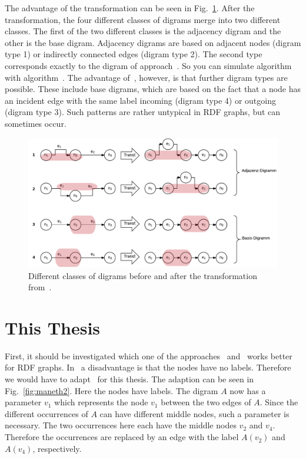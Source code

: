 \documentclass[a4paper]{scrartcl}
\begin{document}
The advantage of the transformation can be seen in Fig.~\ref{fig:digrams_transf}. After the transformation, the four different classes of digrams merge into two different classes. The first of the two different classes is the adjacency digram and the other is the base digram. Adjacency digrams are based on adjacent nodes (digram type 1) or indirectly connected edges (digram type 2). The second type corresponds exactly to the digram of approach~\cite{maneth}. So you can simulate algorithm~\cite{maneth} with algorithm~\cite{mattdk}. The advantage of~\cite{mattdk}, however, is that further digram types are possible. These include base digrams, which are based on the fact that a node has an incident edge with the same label incoming (digram type 4) or outgoing (digram type 3). Such patterns are rather untypical in RDF graphs, but can sometimes occur.

\begin{figure}[h]
	\centering
	\includegraphics[width=1\textwidth]{img/digrams_transf}
	\caption{Different classes of digrams before and after the transformation from~\cite{mattdk}.}
	\label{fig:digrams_transf}
\end{figure}



\section{This Thesis}

First, it should be investigated which one of the approaches~\cite{maneth} and~\cite{mattdk} works better for RDF graphs.
In~\cite{maneth} a disadvantage is that the nodes have no labels. Therefore we would have to adapt~\cite{maneth} for this thesis. The adaption can be seen in Fig.~\ref{fig:maneth2}. Here the nodes have labels. The digram $A$ now has a parameter $v_1$ which represents the node $v_1$ between the two edges of $A$. Since the different occurrences of $A$ can have different middle nodes, such a parameter is necessary. The two occurrences here each have the middle nodes $v_2$ and $v_4$. Therefore the occurrences are replaced by an edge with the label $A(v_2)$ and $A(v_4)$, respectively.
\end{document}
